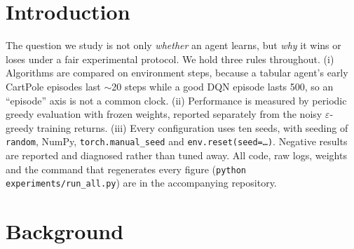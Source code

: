 \begin{abstract}
We compare tabular Q-learning on a discretized state space with a Deep Q-Network (DQN) implemented
from scratch in PyTorch. Every curve is indexed by \emph{cumulative environment steps}, averaged over
ten fixed seeds with 95\% Student-$t$ confidence bands, and evaluated greedily ($\varepsilon=0$, frozen
weights) at regular checkpoints. On CartPole-v1, DQN reaches the solved threshold in
$\approx$7$\times$ fewer environment steps than the best tabular agent, but each step costs
$\approx$23$\times$ more CPU, so tabular learning is $\approx$3$\times$ cheaper per unit of \emph{compute}. On the
sparse-reward MountainCar-v0, DQN with $\varepsilon$-greedy exploration never reaches the goal and
converges to a flat $Q\approx-1/(1-\gamma)$. An optimistically initialized table solves it, while a
pessimistically initialized one fails like DQN, which isolates optimism as the cause. On LunarLander-v3,
ablations show how the target network and the replay buffer each contribute to stability. We close
with an analysis of why neither family scales to continuous control or pixel observations.
Code, logs and figures are available at
\url{https://github.com/iceorsantiago/AI-project}.
\end{abstract}

\section{Introduction}
The question we study is not only \emph{whether} an agent learns, but \emph{why} it wins or loses
under a fair experimental protocol. We hold three rules throughout. (i) Algorithms are compared on
environment steps, because a tabular agent's early CartPole episodes last $\sim$20 steps while a good
DQN episode lasts 500, so an ``episode'' axis is not a common clock. (ii) Performance is measured by
periodic greedy evaluation with frozen weights, reported separately from the noisy $\varepsilon$-greedy
training returns. (iii) Every configuration uses ten seeds, with seeding of
\texttt{random}, NumPy, \texttt{torch.manual\_seed} and \texttt{env.reset(seed=\dots)}. Negative results
are reported and diagnosed rather than tuned away. All code, raw logs, weights and the command that
regenerates every figure (\texttt{python experiments/run\_all.py}) are in the accompanying repository.

\section{Background}
